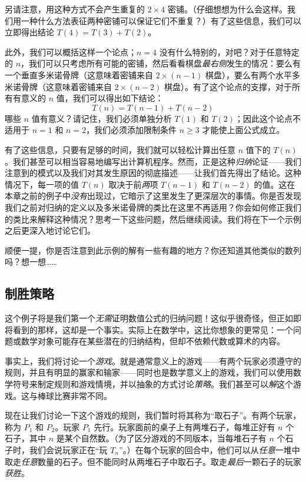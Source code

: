 另请注意，用这种方式不会产生重复的 $2 \times 4$ 密铺。（仔细想想为什么会这样。我们用一种什么方法表征两种密铺可以保证它们不重复？）有了这些信息，我们可以立即得出结论 $T(4) = T(3) + T(2)$。

此外，我们可以概括这样一个论点；$n = 4$ 没有什么特别的，对吧？对于任意特定的 $n$，我们可以只考虑所有可能的密铺，然后看看棋盘\emph{最右侧}发生的情况：要么有一个垂直多米诺骨牌（这意味着密铺来自 $2 \times (n - 1)$ 棋盘），要么有两个水平多米诺骨牌（这意味着密铺来自 $2 \times (n-2)$ 棋盘）。有了这个论点的支撑，对于所有有意义的 $n$ 值，我们可以得出如下结论：
\[T(n) = T(n - 1) + T(n - 2)\]
哪些 $n$ 值有意义？请记住，我们必须单独分析 $T(1)$ 和 $T(2)$；因此这个论点不适用于 $n=1$ 和 $n=2$，我们必须添加限制条件 $n \ge 3$ 才能使上面公式成立。

有了这些信息，只要有足够的时间，我们就可以轻松计算出任意 $n$ 值下的 $T(n)$。我们甚至可以相当容易地编写出计算机程序。然而，正是这种\emph{归纳}论证——我们注意到的模式以及我们对其发生原因的彻底描述——让我们首先得出了结论。这种情况下，每一项的值 $T(n)$ 取决于前\emph{两}项 $T(n-1)$ 和 $T(n-2)$ 的值。这在本章之前的例子中\emph{没有}出现过，它暗示了这里发生了更深层次的事情。你是否发现我们之前对归纳的定义以及多米诺骨牌的类比在这里不再适用？你会如何修正我们的类比来解释这种情况？思考一下这些问题，然后继续阅读。我们将在下一个示例之后更深入地讨论它们。

顺便一提，你是否注意到此示例的解有一些有趣的地方？你还知道其他类似的数列吗？想一想……

\subsection{制胜策略}

这个例子将是我们第一个\emph{无需}证明数值公式的归纳问题！这似乎很奇怪，但正如即将看到的那样，这却是一个事实。实际上在数学中，这比你想象的更常见：一个问题或数学对象可能存在某些潜在的归纳结构，但却不依赖代数或算术的内容。

事实上，我们将讨论一个\emph{游戏}。就是通常意义上的游戏——有两个玩家必须遵守的规则，并且有明显的赢家和输家——同时也是数学意义上的游戏，我们可以使用数学符号来制定规则和游戏情境，并以抽象的方式讨论\emph{策略}。我们甚至可以\emph{解}这个游戏。这与棒球比赛非常不同。

现在让我们讨论一下这个游戏的规则，我们暂时将其称为``取石子''。有两个玩家，称为 $P_1$ 和 $P_2$。玩家 $P_1$ 先行。玩家面前的桌子上有两堆石子，每堆正好有 $n$ 个石子，其中 $n$ 是某个自然数。（为了区分游戏的不同版本，当每堆石子有 $n$ 个石子时，我们会说玩家正在``玩 $T_n$''。）在每个玩家的回合中，他们可以从\emph{任意}一堆中取走\emph{任意}数量的石子。但不能同时从两堆石子中取石子。取走\emph{最后}一颗石子的玩家\emph{获胜}。

